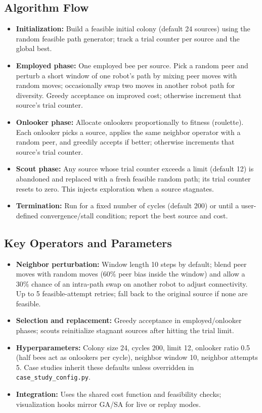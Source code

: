 \subsection{Algorithm Flow}
\begin{itemize}
    \item \textbf{Initialization:} Build a feasible initial colony (default 24 sources) using the random feasible path generator; track a trial counter per source and the global best.
    \item \textbf{Employed phase:} One employed bee per source. Pick a random peer and perturb a short window of one robot’s path by mixing peer moves with random moves; occasionally swap two moves in another robot path for diversity. Greedy acceptance on improved cost; otherwise increment that source’s trial counter.
    \item \textbf{Onlooker phase:} Allocate onlookers proportionally to fitness (roulette). Each onlooker picks a source, applies the same neighbor operator with a random peer, and greedily accepts if better; otherwise increments that source’s trial counter.
    \item \textbf{Scout phase:} Any source whose trial counter exceeds a limit (default 12) is abandoned and replaced with a fresh feasible random path; its trial counter resets to zero. This injects exploration when a source stagnates.
    \item \textbf{Termination:} Run for a fixed number of cycles (default 200) or until a user-defined convergence/stall condition; report the best source and cost.
\end{itemize}

\subsection{Key Operators and Parameters}
\begin{itemize}
    \item \textbf{Neighbor perturbation:} Window length 10 steps by default; blend peer moves with random moves (60\% peer bias inside the window) and allow a 30\% chance of an intra-path swap on another robot to adjust connectivity. Up to 5 feasible-attempt retries; fall back to the original source if none are feasible.
    \item \textbf{Selection and replacement:} Greedy acceptance in employed/onlooker phases; scouts reinitialize stagnant sources after hitting the trial limit.
    \item \textbf{Hyperparameters:} Colony size 24, cycles 200, limit 12, onlooker ratio 0.5 (half bees act as onlookers per cycle), neighbor window 10, neighbor attempts 5. Case studies inherit these defaults unless overridden in \texttt{case\_study\_config.py}.
    \item \textbf{Integration:} Uses the shared cost function and feasibility checks; visualization hooks mirror GA/SA for live or replay modes.
\end{itemize}

